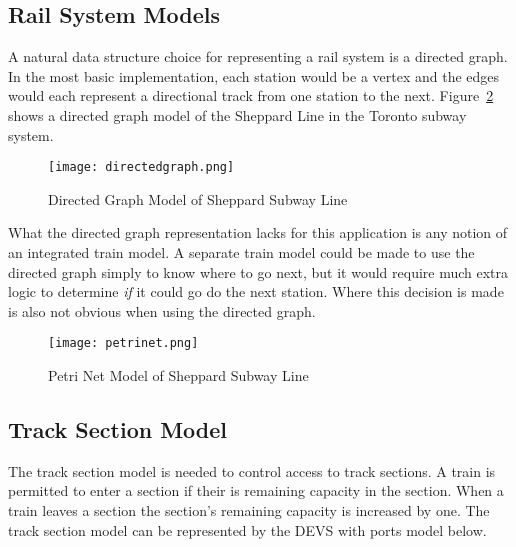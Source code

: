 \subsection{Rail System Models}
A natural data structure choice for representing a rail system is a directed graph.  In the most basic implementation, each station would be a vertex and the edges would each represent a directional track from one station to the next. Figure~\ref{fig:directedgraph} shows a directed graph model of the Sheppard Line in the Toronto subway system.
\begin{figure}[htb]
	\centering
	\texttt{[image: directedgraph.png]}
	\caption{Directed Graph Model of Sheppard Subway Line}
	\label{fig:directedgraph}
\end{figure}
What the directed graph representation lacks for this application is any notion of an integrated train model. A separate train model could be made to use the directed graph simply to know where to go next, but it would require much extra logic to determine \textit{if} it could go do the next station.  Where this decision is made is also not obvious when using the directed graph.

\begin{figure}[htb]
	\centering
	\texttt{[image: petrinet.png]}
	\caption{Petri Net Model of Sheppard Subway Line}
	\label{fig:directedgraph}
\end{figure}

\subsection{Track Section Model}

The track section model is needed to control access to track sections. A train
is permitted to enter a section if their is remaining capacity in the section.
When a train leaves a section the section's remaining capacity is increased by
one. The track section model can be represented by the DEVS with ports model 
below.

\newcommand{\InEnterReq}[0]{(\text{``Enter Request''}, ())}
\newcommand{\InExitReq}[0]{(\text{``Exit Request''}, ())}

\newcommand{\OutEnterRes}[1]{(\text{``Enter Response''}, #1)}

